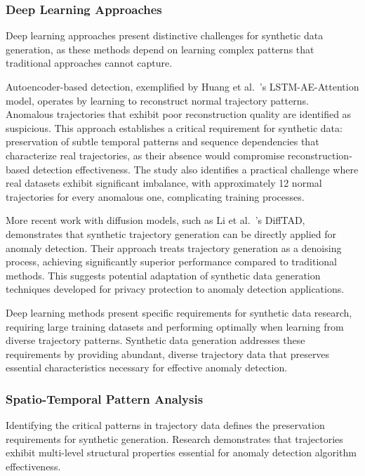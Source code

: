 \documentclass[runningheads]{llncs}
\begin{document}
\subsubsection{Deep Learning Approaches}
\label{sec:deep-learning}

Deep learning approaches present distinctive challenges for synthetic data generation, as these methods depend on learning complex patterns that traditional approaches cannot capture.

Autoencoder-based detection, exemplified by Huang et al.~\cite{huangLSTMAutoencodersAttention2021}'s LSTM-AE-Attention model, operates by learning to reconstruct normal trajectory patterns. Anomalous trajectories that exhibit poor reconstruction quality are identified as suspicious. This approach establishes a critical requirement for synthetic data: preservation of subtle temporal patterns and sequence dependencies that characterize real trajectories, as their absence would compromise reconstruction-based detection effectiveness. The study also identifies a practical challenge where real datasets exhibit significant imbalance, with approximately 12 normal trajectories for every anomalous one, complicating training processes.

More recent work with diffusion models, such as Li et al.~\cite{liDiffusionModelsVehicle2023}'s DiffTAD, demonstrates that synthetic trajectory generation can be directly applied for anomaly detection. Their approach treats trajectory generation as a denoising process, achieving significantly superior performance compared to traditional methods. This suggests potential adaptation of synthetic data generation techniques developed for privacy protection to anomaly detection applications.

Deep learning methods present specific requirements for synthetic data research, requiring large training datasets and performing optimally when learning from diverse trajectory patterns. Synthetic data generation addresses these requirements by providing abundant, diverse trajectory data that preserves essential characteristics necessary for effective anomaly detection.

\subsubsection{Spatio-Temporal Pattern Analysis}
\label{sec:spatio-temporal}

Identifying the critical patterns in trajectory data defines the preservation requirements for synthetic generation. Research demonstrates that trajectories exhibit multi-level structural properties essential for anomaly detection algorithm effectiveness.
\end{document}
